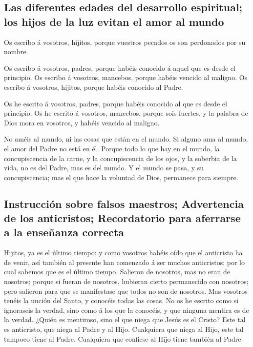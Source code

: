 \hypertarget{las-diferentes-edades-del-desarrollo-espiritual-los-hijos-de-la-luz-evitan-el-amor-al-mundo}{%
\subsection{Las diferentes edades del desarrollo espiritual; los hijos
de la luz evitan el amor al
mundo}\label{las-diferentes-edades-del-desarrollo-espiritual-los-hijos-de-la-luz-evitan-el-amor-al-mundo}}

 Os escribo á vosotros, hijitos, porque vuestros pecados
os son perdonados por su nombre.

 Os escribo á vosotros, padres, porque habéis conocido á
aquel que es desde el principio. Os escribo á vosotros, mancebos, porque
habéis vencido al maligno. Os escribo á vosotros, hijitos, porque habéis
conocido al Padre.

 Os he escrito á vosotros, padres, porque habéis conocido
al que es desde el principio. Os he escrito á vosotros, mancebos, porque
sois fuertes, y la palabra de Dios mora en vosotros, y habéis vencido al
maligno.

 No améis al mundo, ni las cosas que están en el mundo.
Si alguno ama al mundo, el amor del Padre no está en él. 
Porque todo lo que hay en el mundo, la concupiscencia de la carne, y la
concupiscencia de los ojos, y la soberbia de la vida, no es del Padre,
mas es del mundo.  Y el mundo se pasa, y su
concupiscencia; mas el que hace la voluntad de Dios, permanece para
siempre.

\hypertarget{instrucciuxf3n-sobre-falsos-maestros-advertencia-de-los-anticristos-recordatorio-para-aferrarse-a-la-enseuxf1anza-correcta}{%
\subsection{Instrucción sobre falsos maestros; Advertencia de los
anticristos; Recordatorio para aferrarse a la enseñanza
correcta}\label{instrucciuxf3n-sobre-falsos-maestros-advertencia-de-los-anticristos-recordatorio-para-aferrarse-a-la-enseuxf1anza-correcta}}

 Hijitos, ya es el último tiempo: y como vosotros habéis
oído que el anticristo ha de venir, así también al presente han
comenzado á ser muchos anticristos; por lo cual sabemos que es el último
tiempo.  Salieron de nosotros, mas no eran de nosotros;
porque si fueran de nosotros, hubieran cierto permanecido con nosotros;
pero salieron para que se manifestase que todos no son de nosotros.
 Mas vosotros tenéis la unción del Santo, y conocéis
todas las cosas.  No os he escrito como si ignoraseis la
verdad, sino como á los que la conocéis, y que ninguna mentira es de la
verdad.  ¿Quién es mentiroso, sino el que niega que Jesús
es el Cristo? Este tal es anticristo, que niega al Padre y al Hijo.
 Cualquiera que niega al Hijo, este tal tampoco tiene al
Padre. Cualquiera que confiese al Hijo tiene también al Padre.

